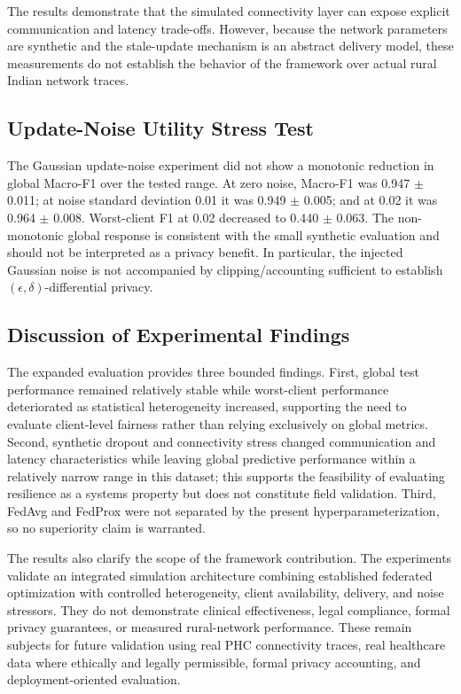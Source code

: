 The results demonstrate that the simulated connectivity layer can expose explicit communication and latency trade-offs. However, because the network parameters are synthetic and the stale-update mechanism is an abstract delivery model, these measurements do not establish the behavior of the framework over actual rural Indian network traces.

\subsection{Update-Noise Utility Stress Test}
The Gaussian update-noise experiment did not show a monotonic reduction in global Macro-F1 over the tested range. At zero noise, Macro-F1 was 0.947 $\pm$ 0.011; at noise standard deviation 0.01 it was 0.949 $\pm$ 0.005; and at 0.02 it was 0.964 $\pm$ 0.008. Worst-client F1 at 0.02 decreased to 0.440 $\pm$ 0.063. The non-monotonic global response is consistent with the small synthetic evaluation and should not be interpreted as a privacy benefit. In particular, the injected Gaussian noise is not accompanied by clipping/accounting sufficient to establish $(\epsilon,\delta)$-differential privacy.

\subsection{Discussion of Experimental Findings}
The expanded evaluation provides three bounded findings. First, global test performance remained relatively stable while worst-client performance deteriorated as statistical heterogeneity increased, supporting the need to evaluate client-level fairness rather than relying exclusively on global metrics. Second, synthetic dropout and connectivity stress changed communication and latency characteristics while leaving global predictive performance within a relatively narrow range in this dataset; this supports the feasibility of evaluating resilience as a systems property but does not constitute field validation. Third, FedAvg and FedProx were not separated by the present hyperparameterization, so no superiority claim is warranted.

The results also clarify the scope of the framework contribution. The experiments validate an integrated simulation architecture combining established federated optimization with controlled heterogeneity, client availability, delivery, and noise stressors. They do not demonstrate clinical effectiveness, legal compliance, formal privacy guarantees, or measured rural-network performance. These remain subjects for future validation using real PHC connectivity traces, real healthcare data where ethically and legally permissible, formal privacy accounting, and deployment-oriented evaluation.
